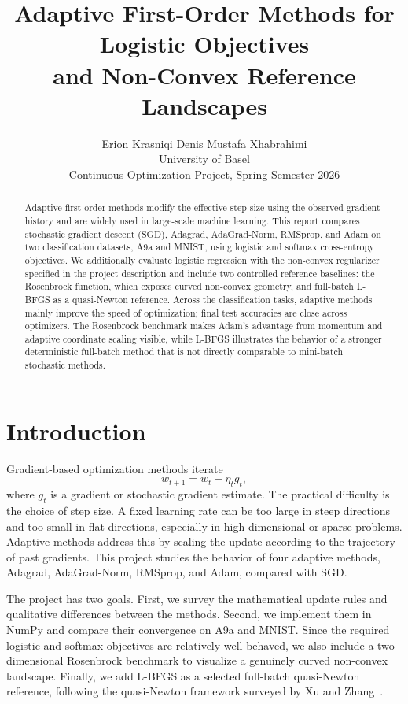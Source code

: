 \documentclass{article}
\title{Adaptive First-Order Methods for Logistic Objectives\\
and Non-Convex Reference Landscapes}
\author{
  Erion Krasniqi \quad Denis Mustafa Xhabrahimi \\
  University of Basel\\
  Continuous Optimization Project, Spring Semester 2026
}
\begin{document}
\maketitle

\begin{abstract}
Adaptive first-order methods modify the effective step size using the observed gradient history and are widely used in large-scale machine learning. This report compares stochastic gradient descent (SGD), Adagrad, AdaGrad-Norm, RMSprop, and Adam on two classification datasets, A9a and MNIST, using logistic and softmax cross-entropy objectives. We additionally evaluate logistic regression with the non-convex regularizer specified in the project description and include two controlled reference baselines: the Rosenbrock function, which exposes curved non-convex geometry, and full-batch L-BFGS as a quasi-Newton reference. Across the classification tasks, adaptive methods mainly improve the speed of optimization; final test accuracies are close across optimizers. The Rosenbrock benchmark makes Adam's advantage from momentum and adaptive coordinate scaling visible, while L-BFGS illustrates the behavior of a stronger deterministic full-batch method that is not directly comparable to mini-batch stochastic methods.
\end{abstract}

\section{Introduction}
Gradient-based optimization methods iterate
\begin{equation}
    w_{t+1}=w_t-\eta_t g_t,
\end{equation}
where $g_t$ is a gradient or stochastic gradient estimate. The practical difficulty is the choice of step size. A fixed learning rate can be too large in steep directions and too small in flat directions, especially in high-dimensional or sparse problems. Adaptive methods address this by scaling the update according to the trajectory of past gradients. This project studies the behavior of four adaptive methods, Adagrad, AdaGrad-Norm, RMSprop, and Adam, compared with SGD.

The project has two goals. First, we survey the mathematical update rules and qualitative differences between the methods. Second, we implement them in NumPy and compare their convergence on A9a and MNIST. Since the required logistic and softmax objectives are relatively well behaved, we also include a two-dimensional Rosenbrock benchmark to visualize a genuinely curved non-convex landscape. Finally, we add L-BFGS as a selected full-batch quasi-Newton reference, following the quasi-Newton framework surveyed by Xu and Zhang~\citep{xu2001survey}.
\end{document}
